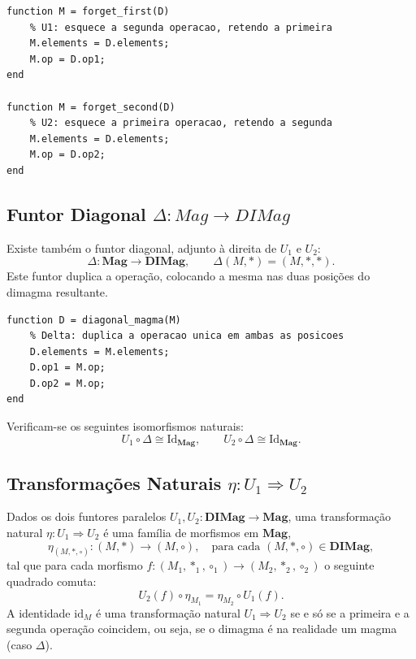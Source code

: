 \begin{lstlisting}[style=matlab, caption={Funtores de esquecimento $U_1$ e $U_2$}]
function M = forget_first(D)
    % U1: esquece a segunda operacao, retendo a primeira
    M.elements = D.elements;
    M.op = D.op1;
end

function M = forget_second(D)
    % U2: esquece a primeira operacao, retendo a segunda
    M.elements = D.elements;
    M.op = D.op2;
end
\end{lstlisting}

\subsection{Funtor Diagonal \texorpdfstring{$\Delta: Mag \to DIMag$}{Delta: Mag -> DIMag}}

Existe também o funtor diagonal, adjunto à direita de $U_1$ e $U_2$:
\[
    \Delta: \mathbf{Mag} \to \mathbf{DIMag}, \qquad \Delta(M, \ast) = (M, \ast, \ast).
\]
Este funtor duplica a operação, colocando a mesma nas duas posições do dimagma resultante.

\begin{lstlisting}[style=matlab, caption={Funtor diagonal $\Delta: \mathbf{Mag} \to \mathbf{DIMag}$}]
function D = diagonal_magma(M)
    % Delta: duplica a operacao unica em ambas as posicoes
    D.elements = M.elements;
    D.op1 = M.op;
    D.op2 = M.op;
end
\end{lstlisting}

\begin{proposition}
Verificam-se os seguintes isomorfismos naturais:
\[
    U_1 \circ \Delta \cong \mathrm{Id}_{\mathbf{Mag}}, \qquad U_2 \circ \Delta \cong \mathrm{Id}_{\mathbf{Mag}}.
\]
\end{proposition}

\subsection{Transformações Naturais \texorpdfstring{$\eta: U_1 \Rightarrow U_2$}{eta: U1 => U2}}

Dados os dois funtores paralelos $U_1, U_2: \mathbf{DIMag} \to \mathbf{Mag}$, uma transformação natural $\eta: U_1 \Rightarrow U_2$ é uma família de morfismos em $\mathbf{Mag}$,
\[
    \eta_{(M,\ast,\circ)}: (M, \ast) \to (M, \circ), \quad \text{para cada } (M,\ast,\circ) \in \mathbf{DIMag},
\]
tal que para cada morfismo $f: (M_1, \ast_1, \circ_1) \to (M_2, \ast_2, \circ_2)$ o seguinte quadrado comuta:
\[
    U_2(f) \circ \eta_{M_1} = \eta_{M_2} \circ U_1(f).
\]
A identidade $\mathrm{id}_M$ é uma transformação natural $U_1 \Rightarrow U_2$ se e só se a primeira e a segunda operação coincidem, ou seja, se o dimagma é na realidade um magma (caso $\Delta$).

